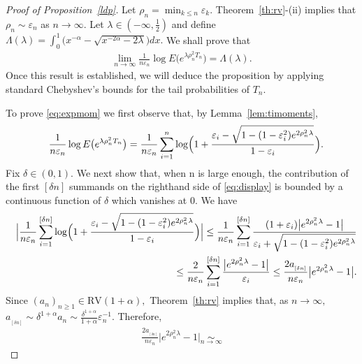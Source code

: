 \documentclass[12pt]{amsart}
\begin{document}
\begin{proof}[Proof of Proposition~\ref{ldp}]
Let $\rho_n = \min_{k\le n} {\varepsilon}_k$. Theorem~\ref{th:rv}-(ii) implies that $\rho_n \sim
{\varepsilon}_n$  as $n\to\infty.$ Let $\lambda \in (-\infty,\frac 12)$ and define $ \Lambda(\lambda)= \int_0^1
\bigl(x^{-\alpha}-\sqrt{x^{-2\alpha}-2\lambda}\bigr) dx.$ We
shall prove that \begin{eqnarray} \label{eq:expmom} \lim_{n\to\infty}
\frac{1}{n{\varepsilon}_n} \log E \bigl(e^{\lambda \rho_n^2  T_n} \bigr)=
\Lambda(\lambda). \end{eqnarray} Once this result is established, we will
deduce the proposition by applying standard Chebyshev's bounds for
the tail probabilities of $T_n.$
\par
To prove \eqref{eq:expmom} we first observe that, by Lemma~\ref{lem:timoments},
\begin{eqnarray}
\label{eq:display}
&&
\frac{1}{n{\varepsilon}_n} \log E\bigl(e^{\lambda \rho_n^2 T_n}\bigr)=
\frac{1}{n{\varepsilon}_n}\sum_{i=1}^n
\log\Bigl(1+{\frac {\displaystyle {{\varepsilon}_i-\sqrt{1-(1-{\varepsilon}_i^2)e^{2\rho_n^2 \lambda}}}}{\displaystyle {1-{\varepsilon}_i} }}\Bigr).
\end{eqnarray}
Fix $\delta \in (0,1)$.  We next show that, when n is large
enough, the contribution of the first $[\delta n]$ summands on the righthand side
of \eqref{eq:display} is bounded by a continuous function of $\delta$ which vanishes at $0.$
We have
\begin{eqnarray*}
&&
\Bigl|\frac{1}{n{\varepsilon}_n}\sum_{i=1}^{[\delta n]}
\log\Bigl(1+{\frac {\displaystyle {{\varepsilon}_i-\sqrt{1-(1-{\varepsilon}_i^2)e^{2\rho_n^2 \lambda}}}}{\displaystyle {1-{\varepsilon}_i} }}\Bigr)\Bigr|
\leq
\frac{1}{n{\varepsilon}_n}\sum_{i=1}^{[\delta n]}
{\frac {\displaystyle {(1+{\varepsilon}_i)\bigl|e^{2\rho_n^2 \lambda}-1\bigr|}}{\displaystyle {
{\varepsilon}_i+\sqrt{1-(1-{\varepsilon}_i^2)e^{2\rho_n^2\lambda}}} }}
\\
&&
\qquad
\leq
\frac{2}{n{\varepsilon}_n}\sum_{i=1}^{[\delta n]}
{\frac {\displaystyle {\bigl|e^{2\rho_n^2 \lambda}-1\bigr|}}{\displaystyle {
{\varepsilon}_i} }}\le \frac{2a_{_{[\delta n]}}}{n {\varepsilon}_n}\bigl|e^{2\rho_n^2\lambda}-1\bigr|.
\end{eqnarray*}
Since $(a_n)_{n\geq 1}\in \mbox{RV}(1+\alpha),$ Theorem~\ref{th:rv} implies that, as $n\to\infty,$
$a_{_{[\delta n]}}\sim \delta^{1+\alpha}a_n\sim \frac{\delta^{1+\alpha}}{1+\alpha}{\varepsilon}_n^{-1}.$
Therefore, \begin{eqnarray*} \frac{2a_{_{[\delta n]}}}{n {\varepsilon}_n}\bigl|e^{2\rho_n^2\lambda}-1\bigr| \underset{n\to\infty}{\sim}

\end{eqnarray*}
\end{proof}
\end{document}
